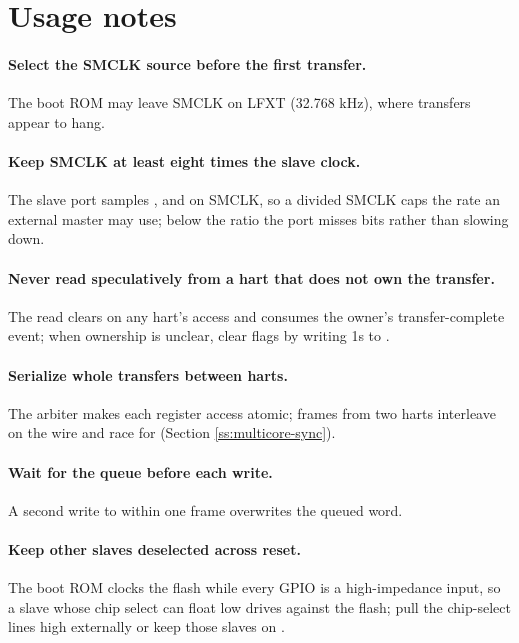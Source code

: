 \section{Usage notes}

\paragraph{Select the SMCLK source before the first transfer.} The boot ROM may leave SMCLK on LFXT (32.768 kHz), where transfers appear to hang.

\paragraph{Keep SMCLK at least eight times the slave clock.} The slave port samples ,  and  on SMCLK, so a divided SMCLK caps the rate an external master may use; below the ratio the port misses bits rather than slowing down.

\paragraph{Never read  speculatively from a hart that does not own the transfer.} The read clears  on any hart's access and consumes the owner's transfer-complete event; when ownership is unclear, clear flags by writing 1s to .

\paragraph{Serialize whole transfers between harts.} The arbiter makes each register access atomic; frames from two harts interleave on the wire and race for  (Section \ref{ss:multicore-sync}).

\paragraph{Wait for the queue before each write.} A second write to  within one frame overwrites the queued word.

\paragraph{Keep other  slaves deselected across reset.} The boot ROM clocks the flash while every GPIO is a high-impedance input, so a slave whose chip select can float low drives  against the flash; pull the chip-select lines high externally or keep those slaves on .

